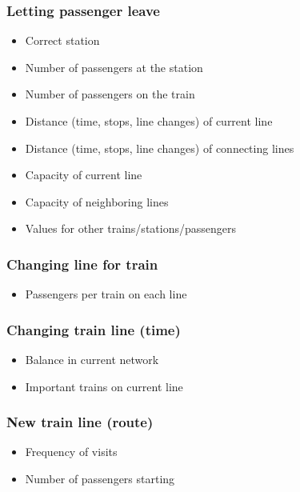 \documentclass[10pt]{report}
\begin{document}
\subsubsection{Letting passenger leave}
\begin{itemize}
    \item Correct station
    \item Number of passengers at the station
    \item Number of passengers on the train
    \item Distance (time, stops, line changes) of current line
    \item Distance (time, stops, line changes) of connecting lines
    \item Capacity of current line
    \item Capacity of neighboring lines
    \item Values for other trains/stations/passengers
\end{itemize}

\subsubsection{Changing line for train}
\begin{itemize}
    \item Passengers per train on each line
\end{itemize}

\subsubsection{Changing train line (time)}
\begin{itemize}
    \item Balance in current network
    \item Important trains on current line
\end{itemize}

\subsubsection{New train line (route)}
\begin{itemize}
    \item Frequency of visits
    \item Number of passengers starting
\end{itemize}
\end{document}
